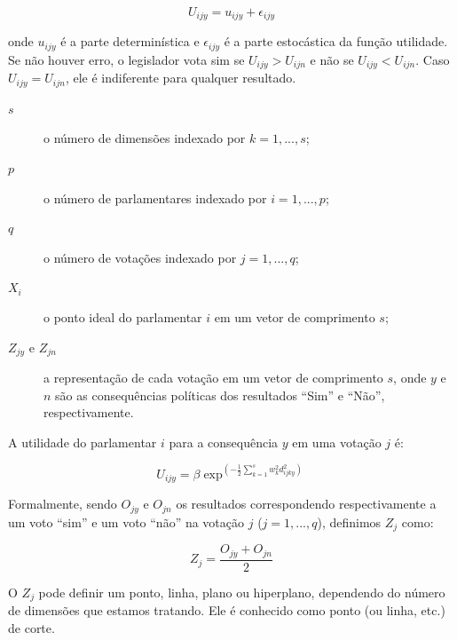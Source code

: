 \documentclass[a4paper,titlepage]{ppgi}\usepackage[]{graphicx}\usepackage[]{color}
\begin{document}
\begin{equation}
  U_{ijy} = u_{ijy} + \epsilon_{ijy}
\end{equation}

onde $u_{ijy}$ é a parte determinística e $\epsilon_{ijy}$ é a parte
estocástica da função utilidade. Se não houver erro, o legislador vota sim se
$U_{ijy} > U_{ijn}$ e não se $U_{ijy} < U_{ijn}$. Caso $U_{ijy} = U_{ijn}$, ele
é indiferente para qualquer resultado.

\begin{description}
\item[$s$] o número de dimensões indexado por $k = 1, ..., s$;
\item[$p$] o número de parlamentares indexado por $i = 1, ..., p$;
\item[$q$] o número de votações indexado por $j = 1, ..., q$;
\item[$X_i$] o ponto ideal do parlamentar $i$ em um vetor de comprimento $s$;
\item[$Z_{jy}$ e $Z_{jn}$] a representação de cada votação em um vetor de comprimento
$s$, onde $y$ e $n$ são as consequências políticas dos resultados ``Sim'' e
``Não'', respectivamente.
\end{description}

A utilidade do parlamentar $i$ para a consequência $y$ em uma votação $j$ é:

\begin{equation}
  U_{ijy} = \beta \exp^{\left( - \frac{1}{2} \sum\limits_{k=1}^s w_k^2 d_{ijky}^2 \right)}
\end{equation}

Formalmente, sendo $O_{jy}$ e $O_{jn}$ os resultados correspondendo
respectivamente a um voto ``sim'' e um voto ``não'' na votação $j$ ($j = 1,
..., q$), definimos $Z_j$ como: 

\begin{equation}\label{eq:cutpoint}
  Z_j = \frac{O_{jy} + O_{jn}}{2}
\end{equation}

O $Z_j$ pode definir um ponto, linha, plano ou hiperplano, dependendo do número
de dimensões que estamos tratando. Ele é conhecido como ponto (ou linha, etc.)
de corte.




\end{document}
